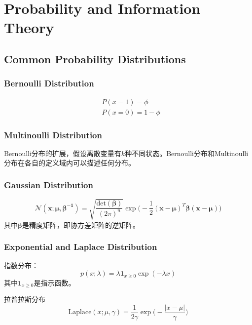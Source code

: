 \chapter{Probability and Information Theory}

\setcounter{section}{8}
\section{Common Probability Distributions}

\subsection{Bernoulli Distribution}
\begin{equation}\begin{split}
&P(x=1)=\phi\\
&P(x=0)=1-\phi
\end{split}\end{equation}

\subsection{Multinoulli Distribution}

Bernoulli分布的扩展，假设离散变量有$k$种不同状态。Bernoulli分布和Multinoulli分布在各自的定义域内可以描述任何分布。

\subsection{Gaussian Distribution}

\begin{equation}
\mathcal N(\bm x;\bm{\mu,\beta^{-1}})=\sqrt{\frac{\text{det}(\bm\beta)}{(2\pi)^n}}\exp\Big(-\frac{1}{2}(\bm{x-\mu})^T\bm\beta(\bm{x-\mu})\Big)
\end{equation}
其中$\bm\beta$是精度矩阵，即协方差矩阵的逆矩阵。

\subsection{Exponential and Laplace Distribution}

指数分布：
\begin{equation}
p(x;\lambda)=\lambda\bm{1}_{x\ge 0}\exp(-\lambda x)
\end{equation}
其中$\bm{1}_{x\ge 0}$是指示函数。

拉普拉斯分布
\begin{equation}
\text{Laplace}(x;\mu,\gamma)=\frac{1}{2\gamma}\exp\Big(-\frac{|x-\mu|}{\gamma}\Big)
\end{equation}

